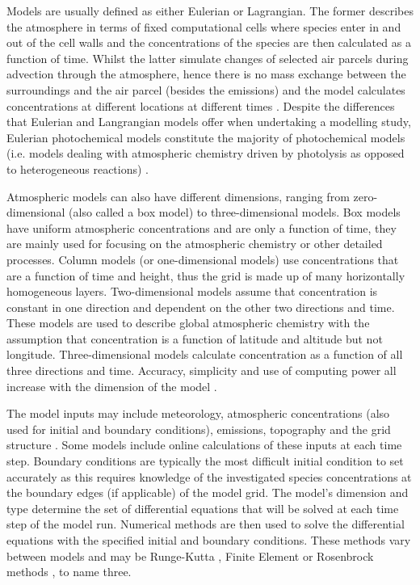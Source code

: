 Models are usually defined as either Eulerian or Lagrangian. The former describes the atmosphere in terms of fixed 
computational cells where species enter in and out of the cell walls and the concentrations of the species are then calculated 
as a function of time. Whilst the latter simulate changes of selected air parcels during advection through the atmosphere, 
hence there is no mass exchange between the surroundings and the air parcel (besides the emissions) and the model calculates 
concentrations at different locations at different times \citep{Seinfeld:2006}. Despite the differences that Eulerian and 
Langrangian models offer when undertaking a modelling study, Eulerian photochemical models constitute the majority of 
photochemical models (i.e. models dealing with atmospheric chemistry driven by photolysis as opposed to heterogeneous 
reactions) \citep{Russell:2000}.

Atmospheric models can also have different dimensions, ranging from zero-dimensional (also called a box model) to 
three-dimensional models. Box models have uniform atmospheric concentrations and are only a function of time, they are mainly 
used for focusing on the atmospheric chemistry or other detailed processes. Column models (or one-dimensional models) use 
concentrations that are a function of time and height, thus the grid is made up of many horizontally homogeneous layers. 
Two-dimensional models assume that concentration is constant in one direction and dependent on the other two directions and 
time. These models are used to describe global atmospheric chemistry with the assumption that concentration is a function of 
latitude and altitude but not longitude.  Three-dimensional models calculate concentration as a function of all three 
directions and time. Accuracy, simplicity and use of computing power all increase with the dimension of the model 
\citep{Seinfeld:2006}.

The model inputs may include meteorology, atmospheric concentrations (also used for initial and boundary conditions), 
emissions, topography and the grid structure \citep{Russell:2000}. Some models include online calculations of these inputs at 
each time step. Boundary conditions are typically the most difficult initial condition to set accurately as this requires 
knowledge of the investigated species concentrations at the boundary edges (if applicable) of the model grid. The model's 
dimension and type determine the set of differential equations that will be solved at each time step of the model run. 
Numerical methods are then used to solve the differential equations with the specified initial and boundary conditions. These 
methods vary between models and may be Runge-Kutta \citep{Sandu:1997b}, Finite Element \citep{Russell:2000} or Rosenbrock methods
\citep{Sandu:1997a}, to name three.

